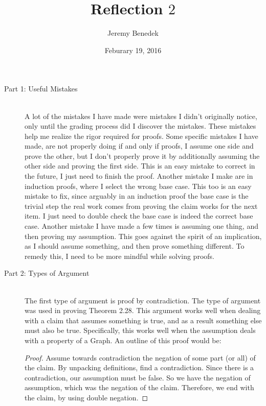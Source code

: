 \documentclass{article}
\title{Reflection $2$}
\author{Jeremy Benedek}
\date{Feburary 19, 2016}
\begin{document}
\maketitle

\begin{description}
	\item[Part 1: Useful Mistakes] \hfill \\
		A lot of the mistakes I have made were mistakes I didn't originally notice, only until the grading process did I discover
		the mistakes. These mistakes help me realize the rigor required for proofs. Some specific mistakes I have made,
		are not properly doing if and only if proofs, I assume one side and prove the other, but I don't properly prove it by 
		additionally assuming the other side and proving the first side. This is an easy mistake to correct in the future, I 
		just need to finish the proof. Another mistake I make are in induction proofs, where I select
		the wrong base case. This too is an easy mistake to fix, since arguably in an induction proof the base case is the trivial step
		the real work comes from proving the claim works for the next item. I just need to double check the base case is indeed the correct
		base case. Another mistake I have made a few times is assuming one thing, and then proving my assumption. This goes against the 
		spirit of an implication, as I should assume something, and then prove something different. To remedy this, I need to be more mindful
		while solving proofs. 

	\item[Part 2: Types of Argument] \hfil \\
	  The first type of argument is proof by contradiction. The type of argument was used in proving Theorem 2.28. This argument works well
	  when dealing with a claim that assumes something is true, and as a result something else must also be true. Specifically, this works well when
	  the assumption deals with a property of a Graph.
	An outline of this proof would be: \\ 
	\begin{proof} Assume towards contradiction the negation of some part (or all) of the claim. By unpacking definitions, find a contradiction.
	  Since there is a contradiction, our assumption must be false. So we have the negation of assumption, which was the negation of the claim. 
	Therefore, we end with the claim, by using double negation. \end{proof}


\end{description}
\end{document}
